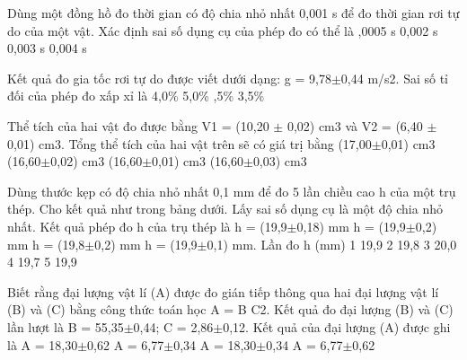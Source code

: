 \begin{ex} Dùng một đồng hồ đo thời gian có độ chia nhỏ nhất 0,001 s để đo thời gian rơi
tự do của một vật. Xác định sai số dụng cụ của phép đo có thể là
\choice
{,0005 s}
{0,002 s}
{0,003 s}
{0,004 s}
\loigiai{}
\end{ex}

\begin{ex} Kết quả đo gia tốc rơi tự do được viết dưới dạng: g = 9,78$\pm$0,44 m/s2. Sai số tỉ
đối của phép đo xấp xỉ là
\choice
{4,0\%}
{5,0\%}
{,5\%}
{3,5\%}
\loigiai{}
\end{ex}

\begin{ex} Thể tích của hai vật đo được bằng V1 = (10,20 $\pm$ 0,02) cm3 và V2 = (6,40 $\pm$
0,01) cm3. Tổng thể tích của hai vật trên sẽ có giá trị bằng
\choice
{(17,00$\pm$0,01) cm3}
{(16,60$\pm$0,02) cm3}
{(16,60$\pm$0,01) cm3}
{\True (16,60$\pm$0,03) cm3}
\end{ex}

\begin{ex} Dùng thước kẹp có độ chia nhỏ nhất 0,1 mm để đo 5 lần
chiều cao h của một trụ thép. Cho kết quả như trong bảng dưới. Lấy
sai số dụng cụ là một độ chia nhỏ nhất. Kết quả phép đo h của trụ
thép là
\choice
{h = (19,9$\pm$0,18) mm}
{\True h = (19,9$\pm$0,2) mm}
{h = (19,8$\pm$0,2) mm}
{h = (19,9$\pm$0,1) mm. Lần đo h (mm) 1 19,9 2 19,8 3 20,0 4 19,7 5 19,9}
\end{ex}

\begin{ex} Biết rằng đại lượng vật lí (A) được đo gián tiếp thông qua hai đại lượng vật
lí (B) và (C) bằng công thức toán học A = B
C2. Kết quả đo đại lượng (B) và (C) lần lượt là
B = 55,35$\pm$0,44; C = 2,86$\pm$0,12. Kết quả của đại lượng (A) được ghi là
\choice
{A = 18,30$\pm$0,62}
{A = 6,77$\pm$0,34}
{A = 18,30$\pm$0,34}
{\True A = 6,77$\pm$0,62}
\end{ex}

